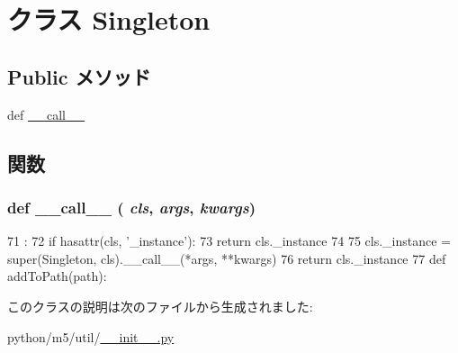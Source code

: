 \hypertarget{classm5_1_1util_1_1Singleton}{
\section{クラス Singleton}
\label{classm5_1_1util_1_1Singleton}
}
\subsection*{Public メソッド}
\begin{DoxyCompactItemize}
\item 
def \hyperlink{classm5_1_1util_1_1Singleton_ae844e0019d38360a86bac1474132db3c}{\_\-\_\-call\_\-\_\-}
\end{DoxyCompactItemize}


\subsection{関数}
\hypertarget{classm5_1_1util_1_1Singleton_ae844e0019d38360a86bac1474132db3c}{
\subsubsection[{\_\-\_\-call\_\-\_\-}]{\setlength{\rightskip}{0pt plus 5cm}def \_\-\_\-call\_\-\_\- ( {\em cls}, \/   {\em args}, \/   {\em kwargs})}}
\label{classm5_1_1util_1_1Singleton_ae844e0019d38360a86bac1474132db3c}



\begin{DoxyCode}
71                                       :
72         if hasattr(cls, '_instance'):
73             return cls._instance
74 
75         cls._instance = super(Singleton, cls).__call__(*args, **kwargs)
76         return cls._instance
77 
def addToPath(path):
\end{DoxyCode}


このクラスの説明は次のファイルから生成されました:\begin{DoxyCompactItemize}
\item 
python/m5/util/\hyperlink{python_2m5_2util_2____init_____8py}{\_\-\_\-init\_\-\_\-.py}\end{DoxyCompactItemize}
